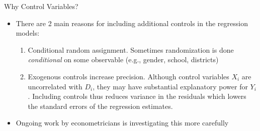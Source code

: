 \documentclass{beamer}
\begin{document}
\begin{frame}{Why Control Variables?}
  \begin{itemize}
    \item There are 2 main reasons for including additional controls in the regression models:
          \begin{enumerate}
            \item Conditional random assignment.  Sometimes randomization is done \emph{conditional} on some observable (e.g., gender, school, districts)
            \item Exogenous controls increase precision.  Although control variables $X_i$ are uncorrelated with $D_i$, they may have substantial explanatory power for $Y_i$. Including controls thus reduces variance in the residuals which lowers the standard errors of the regression estimates.
          \end{enumerate}
    \item Ongoing work by econometricians is investigating this more carefully
  \end{itemize}
\end{frame}
\end{document}
